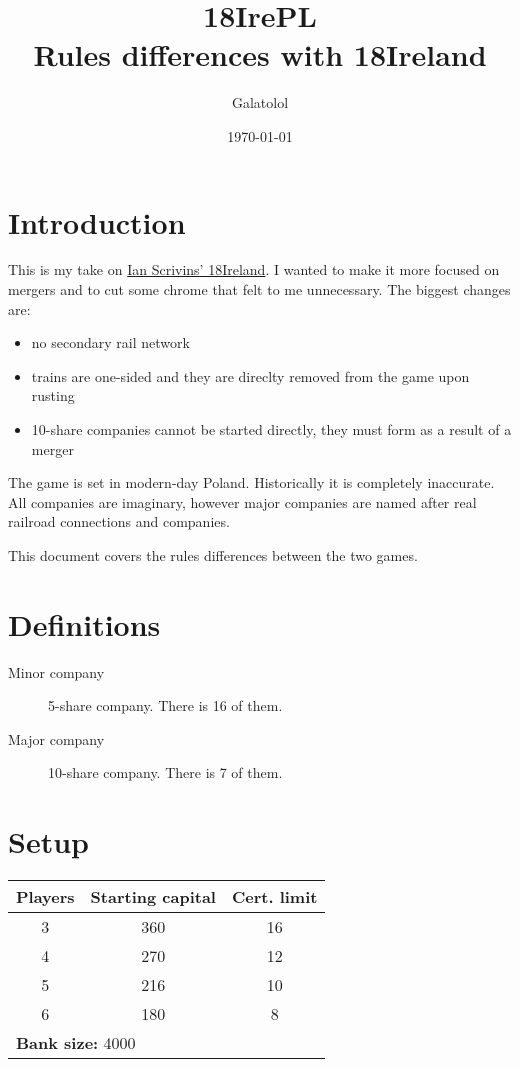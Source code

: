 \documentclass[10pt,a4paper,twocolumn]{article}
\title{18IrePL\\ \large{Rules differences with 18Ireland}}
\author{Galatolol}
\date{\today}
\begin{document}
\maketitle

\section{Introduction}
This is my take on \href{https://boardgamegeek.com/boardgame/196217/18ireland}{Ian Scrivins' 18Ireland}. I wanted to make it more focused on mergers and to cut some chrome that felt to me unnecessary. The biggest changes are: 
\begin{itemize}
\item no secondary rail network
\item trains are one-sided and they are direclty removed from the game upon rusting
\item 10-share companies cannot be started directly, they must form as a result of a merger
\end{itemize}

The game is set in modern-day Poland. Historically it is completely inaccurate. All companies are imaginary, however major companies are named after real railroad connections and companies.

This document covers the rules differences between the two games.



\section{Definitions}
\begin{description}
	\item [Minor company] 5-share company. There is 16 of them.
	\item [Major company] 10-share company. There is 7 of them.
\end{description}

\section{Setup}

\begin{center}
  \begin{tabular}{ | c | c | c | }
    \hline
    \textbf{Players} & \textbf{Starting capital} & \textbf{Cert. limit} \\ \hline
    3 & 360 & 16 \\ \hline
    4 & 270 & 12 \\ \hline
    5 & 216 & 10 \\ \hline
    6 & 180 & 8 \\ 
    \hline
      \multicolumn{3}{|l|}{\textbf{Bank size:} 4000} \\
 	\hline
  \end{tabular}
\end{center}
\end{document}
